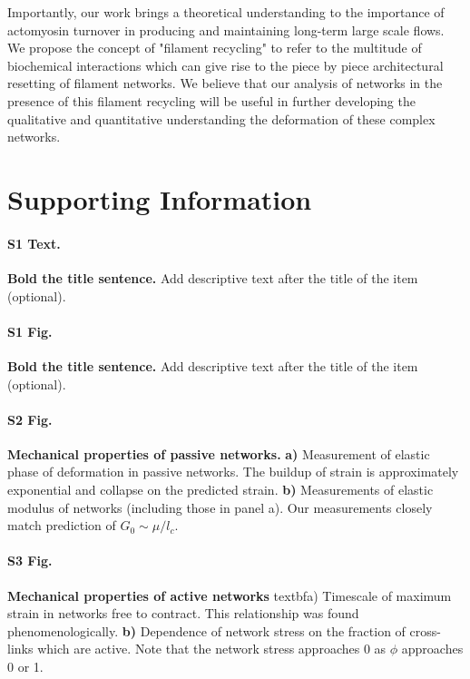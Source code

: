 \documentclass[10pt,letterpaper]{article}
\begin{document}
Importantly, our work brings a theoretical understanding to the importance of actomyosin turnover in producing and maintaining long-term large scale flows.  We propose the concept of "filament recycling" to refer to the multitude of biochemical interactions which can give rise to the piece by piece architectural resetting of filament networks.  We believe that our analysis of networks in the presence of this filament recycling will be useful in further developing the qualitative and quantitative understanding the deformation of these complex networks.

\section*{Supporting Information}

\paragraph*{S1 Text.}
\label{S1_Text}
{\bf Bold the title sentence.} Add descriptive text after the title of the item (optional).

\paragraph*{S1 Fig.}
\label{S1_Fig}
{\bf Bold the title sentence.} Add descriptive text after the title of the item (optional).

\paragraph*{S2 Fig.}
\label{fig:passive_supp}
{\bf  Mechanical properties of passive networks.}  \textbf{a)} Measurement of elastic phase of deformation in passive networks.  The buildup of strain is approximately exponential and collapse on the predicted strain.  \textbf{b)}  Measurements of elastic modulus of networks (including those in panel a).  Our measurements closely match prediction of $G_0\sim \mu/l_c$.

\paragraph*{S3 Fig.}
\label{fig:active_supp}
{\bf Mechanical properties of active networks } textbf{a)}  Timescale of maximum strain in networks free to contract.  This relationship was found phenomenologically.  \textbf{b)}  Dependence of network stress on the fraction of cross-links which are active.  Note that the network stress approaches 0 as $\phi$ approaches 0 or 1.
\end{document}

